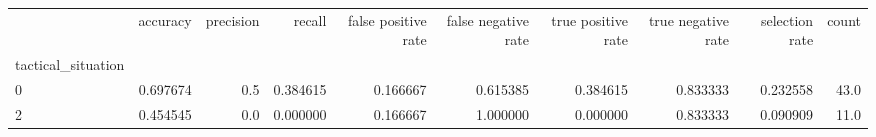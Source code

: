 \begin{tabular}{lrrrrrrrrr}
\toprule
{} &  accuracy &  precision &    recall &  false positive rate &  false negative rate &  true positive rate &  true negative rate &  selection rate &  count \\
tactical\_situation &           &            &           &                      &                      &                     &                     &                 &        \\
\midrule
0                  &  0.697674 &        0.5 &  0.384615 &             0.166667 &             0.615385 &            0.384615 &            0.833333 &        0.232558 &   43.0 \\
2                  &  0.454545 &        0.0 &  0.000000 &             0.166667 &             1.000000 &            0.000000 &            0.833333 &        0.090909 &   11.0 \\
\bottomrule
\end{tabular}
